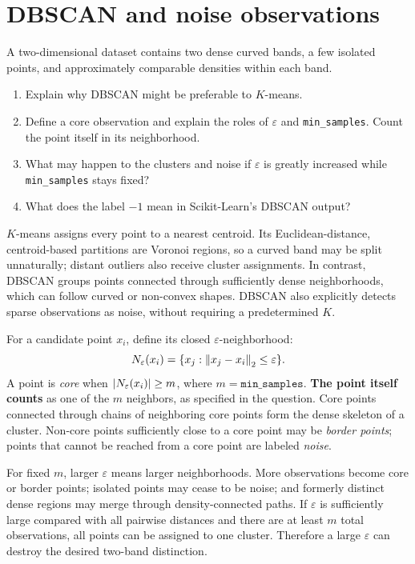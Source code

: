 \section{DBSCAN and noise observations}
\label{sec:ex3}
\begin{problem}
A two-dimensional dataset contains two dense curved bands, a few isolated points, and approximately comparable densities within each band.
\begin{enumerate}[label=\textbf{(\alph*)}]
\item Explain why DBSCAN might be preferable to $K$-means.
\item Define a core observation and explain the roles of $\varepsilon$ and \texttt{min\_samples}. Count the point itself in its neighborhood.
\item What may happen to the clusters and noise if $\varepsilon$ is greatly increased while \texttt{min\_samples} stays fixed?
\item What does the label $-1$ mean in Scikit-Learn's DBSCAN output?
\end{enumerate}
\end{problem}


$K$-means assigns every point to a nearest centroid. Its Euclidean-distance, centroid-based partitions are Voronoi regions, so a curved band may be split unnaturally; distant outliers also receive cluster assignments. In contrast, DBSCAN groups points connected through sufficiently dense neighborhoods, which can follow curved or non-convex shapes. DBSCAN also explicitly detects sparse observations as noise, without requiring a predetermined $K$.

For a candidate point $x_i$, define its closed $\varepsilon$-neighborhood:
\[
N_{\varepsilon}(x_i)=\{x_j:\left\lVert x_j-x_i\right\rVert_2\leq\varepsilon\}.
\]
A point is \emph{core} when $\left\lvert N_{\varepsilon}(x_i)\right\rvert\geq m$, where $m=\texttt{min\_samples}$. \textbf{The point itself counts} as one of the $m$ neighbors, as specified in the question. Core points connected through chains of neighboring core points form the dense skeleton of a cluster. Non-core points sufficiently close to a core point may be \emph{border points}; points that cannot be reached from a core point are labeled \emph{noise}.

For fixed $m$, larger $\varepsilon$ means larger neighborhoods. More observations become core or border points; isolated points may cease to be noise; and formerly distinct dense regions may merge through density-connected paths. If $\varepsilon$ is sufficiently large compared with all pairwise distances and there are at least $m$ total observations, all points can be assigned to one cluster. Therefore a large $\varepsilon$ can destroy the desired two-band distinction.

